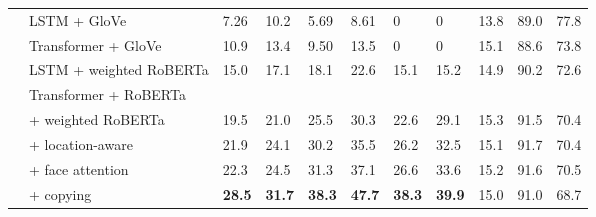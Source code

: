 \begin{table*}[p]
\begin{tabularx}{\textwidth}{llXXXXXX XXX}
      & LSTM + GloVe & 7.26 & 10.2 & 5.69 & 8.61 & 0 & 0 & 13.8 & 89.0 & 77.8 \\
      & Transformer + GloVe & 10.9 & 13.4 & 9.50 & 13.5 & 0 & 0 & 15.1 & 88.6 & 73.8 \\
      & LSTM + weighted RoBERTa & 15.0 & 17.1 & 18.1 & 22.6 & 15.1 & 15.2 & 14.9 & 90.2 & 72.6 \\
      \cmidrule{2-11}
      & Transformer + RoBERTa \\
      & \quad + weighted RoBERTa & 19.5 & 21.0 & 25.5 & 30.3 & 22.6 & 29.1 & 15.3 & 91.5 & 70.4 \\
      & \quad\quad + location-aware & 21.9 & 24.1 & 30.2 & 35.5 & 26.2 & 32.5 & 15.1 & 91.7 & 70.4  \\
      & \quad\quad\quad + face attention & 22.3 & 24.5 & 31.3 & 37.1 & 26.6 & 33.6 & 15.2 & 91.6 & 70.5 \\
      & \quad\quad\quad\quad + copying & \textbf{28.5} & \textbf{31.7} & \textbf{38.3} & \textbf{47.7} & \textbf{38.3} & \textbf{39.9} & 15.0 & 91.0 & 68.7 \\
		\bottomrule
	\end{tabularx}
\end{table*}

\twocolumn
